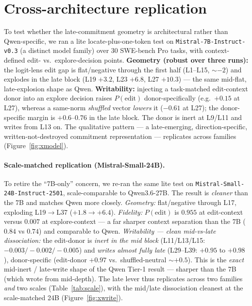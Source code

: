 \documentclass[11pt]{article}
\begin{document}
\section{Cross-architecture replication}\label{sec:xmodel}
To test whether the late-commitment geometry is architectural rather than Qwen-specific, we ran a lite
locate-plus-one-token test on \texttt{Mistral-7B-Instruct-v0.3} (a distinct model family) over 30 SWE-bench Pro
tasks, with context-defined edit- vs.\ explore-decision points. \textbf{Geometry (robust over three runs):}
the logit-lens edit gap is flat/negative through the first half (L1--L15, $\sim-2$) and explodes in the late
block (L19 $+3.2$, L23 $+6.8$, L27 $+10.3$) --- the same mid-flat, late-explosion shape as Qwen.
\textbf{Writability:} injecting a task-matched edit-context donor into an explore decision raises
$P(\text{edit})$ donor-specifically (e.g.\ $+0.15$ at L27), whereas a same-norm \emph{shuffled} vector
\emph{lowers} it ($-0.61$ at L27); the donor-specific margin is $+0.6$--$0.76$ in the late block. The donor is
inert at L9/L11 and writes from L13 on. The qualitative pattern --- a late-emerging, direction-specific,
written-not-destroyed commitment representation --- replicates across families (Figure~\ref{fig:xmodel}).

\paragraph{Scale-matched replication (Mistral-Small-24B).} To retire the ``7B-only'' concern, we re-ran the
same lite test on \texttt{Mistral-Small-24B-Instruct-2501}, scale-comparable to Qwen3.6-27B. The result is
\emph{cleaner} than the 7B and matches Qwen more closely. \emph{Geometry:} flat/negative through L17, exploding
L19$\to$L37 ($+1.8 \to +6.4$). \emph{Fidelity:} $P(\text{edit})$ is $0.955$ at edit-context versus $0.007$ at
explore-context --- a far sharper context separation than the 7B ($0.84$ vs $0.74$) and comparable to Qwen.
\emph{Writability --- clean mid-vs-late dissociation:} the edit-donor is \emph{inert in the mid block}
(L11/L13/L15: $-0.003/-0.002/-0.005$) and \emph{writes almost fully late} (L29--L39: $+0.95$ to $+0.98$),
donor-specific (edit-donor $+0.97$ vs.\ shuffled-neutral $\sim+0.5$). This is the \emph{exact} mid-inert /
late-write shape of the Qwen Tier-1 result --- sharper than the 7B (which wrote from mid-depth). The late lever
thus replicates across two families \emph{and} two scales (Table~\ref{tab:scale}), with the mid/late
dissociation cleanest at the scale-matched 24B (Figure~\ref{fig:xwrite}).
\end{document}
